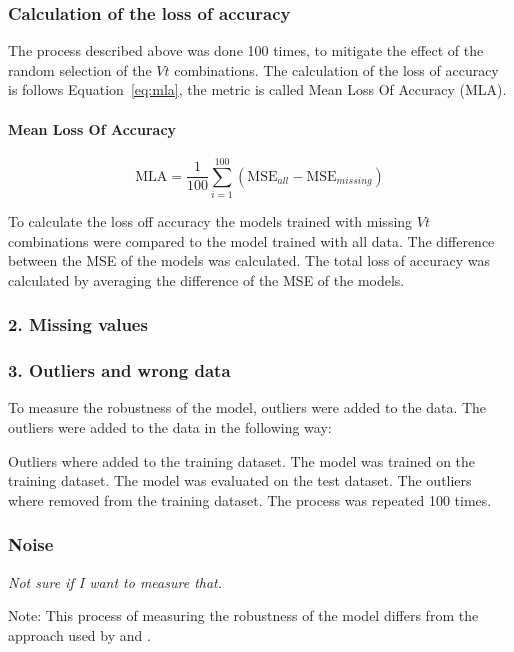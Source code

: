 \subsubsection*{Calculation of the loss of accuracy}
The process described above was done 100 times, to mitigate the effect of the random selection of
the $Vt$ combinations.
The calculation of the loss of accuracy is follows Equation~\ref{eq:mla}, the metric is called
Mean Loss Of Accuracy (\ac{MLA}).

\paragraph*{Mean Loss Of Accuracy}
\begin{equation}
    \label{eq:mla}
    \text{MLA} = \frac{1}{100} \sum_{i=1}^{100} \left( \text{MSE}_{all} - \text{MSE}_{missing}
    \right)
\end{equation}

To calculate the loss off accuracy the models trained with missing $Vt$ combinations were
compared to the model trained with all data.
The difference between the \ac{MSE} of the models was calculated. The total loss of accuracy was
calculated by averaging the difference of the \ac{MSE} of the models.




\subsubsection*{2. Missing values}

\subsubsection*{3. Outliers and wrong data}
To measure the robustness of the model, outliers were added to the data. The outliers were added
to the data in the following way:

Outliers where added to the training dataset.
The model was trained on the training dataset.
The model was evaluated on the test dataset.
The outliers where removed from the training dataset.
The process was repeated 100 times.

\subsubsection*{Noise}
\textit{Not sure if I want to measure that.}


Note: This process of measuring the robustness of the model differs from the approach used by
\cite{siebert_constructionqualitymodel_} and \cite{saez_evaluatingclassifierbehavior_2016}.

